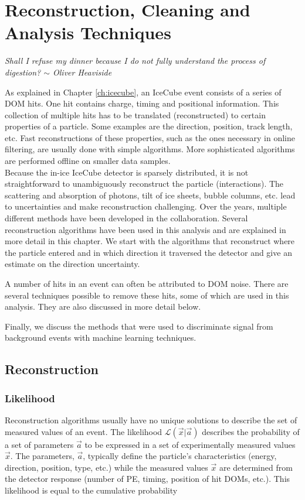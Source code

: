 \chapter{Reconstruction, Cleaning and Analysis Techniques}
\label{ch:reconstruction}
\begin{flushright}
\textit{Shall I refuse my dinner because I do not fully understand the process of digestion? $\sim$ Oliver Heaviside}
\end{flushright}
As explained in Chapter \ref{ch:icecube}, an IceCube event consists of a series of DOM hits. One hit contains charge, timing and positional information. This collection of multiple hits has to be translated (reconstructed) to certain properties of a particle. Some examples are the direction, position, track length, etc. Fast reconstructions of these properties, such as the ones necessary in online filtering, are usually done with simple algorithms. More sophisticated algorithms are performed offline on smaller data samples.\\

\noindent Because the in-ice IceCube detector is sparsely distributed, it is not straightforward to unambiguously reconstruct the particle (interactions). The scattering and absorption of photons, tilt of ice sheets, bubble columns, etc. lead to uncertainties and make reconstruction challenging. Over the years, multiple different methods have been developed in the collaboration. Several reconstruction algorithms have been used in this analysis and are explained in more detail in this chapter. We start with the algorithms that reconstruct where the particle entered and in which direction it traversed the detector and give an estimate on the direction uncertainty.

A number of hits in an event can often be attributed to DOM noise. There are several techniques possible to remove these hits, some of which are used in this analysis. They are also discussed in more detail below.

Finally, we discuss the methods that were used to discriminate signal from background events with machine learning techniques.

\section{Reconstruction}

\subsection{Likelihood}
Reconstruction algorithms usually have no unique solutions to describe the set of measured values of an event. The likelihood $\mathcal{L}(\vec{x} |\vec{a})$ describes the probability of a set of parameters ${\vec{a}}$ to be expressed in a set of experimentally measured values ${\vec{x}}$. The parameters, ${\vec{a}}$, typically define the particle's characteristics (energy, direction, position, type, etc.) while the measured values ${\vec{x}}$ are determined from the detector response (number of PE, timing, position of hit DOMs, etc.). This likelihood is equal to the cumulative probability

